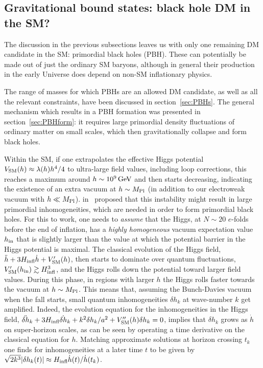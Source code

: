 \subsection{Gravitational bound states: black hole DM in the SM?}\label{sec:PBHSM}
The discussion in the previous subsections leaves us with only one remaining DM candidate in the SM: primordial black holes (PBH). 
These can potentially be made out of just the ordinary SM baryons, although in general their production in the early Universe does depend on non-SM inflationary physics. 


The range of masses for which PBHs are an allowed DM candidate, as well as all the relevant constraints, have been discussed in section~\ref{sec:PBHs}. 
The general mechanism which results in a PBH formation was presented in section~\ref{sec:PBHform}: 
it requires large primordial density fluctuations of ordinary matter on small scales, which then gravitationally collapse and form black holes.

\smallskip



Within the SM, if one extrapolates the effective Higgs potential $V_{\rm SM}(h) \approx \lambda(h) h^4/4$ to ultra-large field values, including loop corrections,
this reaches a maximum around  $h \sim 10^9\,{\rm GeV}$ and then starts decreasing, 
indicating the existence of an extra vacuum at $h \sim M_{\rm Pl}$
(in addition to our electroweak vacuum with $h \ll M_{\rm Pl}$).
 in~\cite{PBHformationTh} proposed that this instability 
might result in large primordial inhomogeneities, which are needed in order to form primordial black holes.
For this to work, one needs to {\em assume} that the Higgs, at $N \sim 20$ $e$-folds before the end of inflation,
has a 
{\em highly homogeneous} vacuum expectation value $h_{\rm in}$ that is slightly larger than the value at which the potential barrier in the Higgs potential is maximal. 
The classical evolution of the Higgs field, $\ddot h + 3 H_{\rm infl} \dot h + V'_{\rm SM}(h)$, 
then starts to dominate over quantum fluctuations, $V'_{\rm SM} (h_{\rm in}) \gtrsim H^3_{\rm infl}$, and the 
Higgs rolls down the potential toward larger field values.
During this phase, in regions with larger $h$ 
the Higgs rolls faster towards the vacuum at $h \sim M_{\rm Pl}$.
This means that, assuming the Bunch-Davies vacuum when the fall starts,
small quantum inhomogeneities $\delta h_k$ at wave-number $k$ get amplified.
Indeed, the evolution equation for the inhomogeneities in the Higgs field, 
$\ddot{\delta h}_k + 3H_{\rm infl} \dot{\delta h}_k +k^2 \delta h_k/a^2 + V_{\rm SM}^{\prime\prime}(h)\delta h_k = 0$, 
implies that $\delta h_k$ grows as $\dot h$  on super-horizon scales,
as can be seen by operating a time derivative on the classical equation for $h$.
Matching approximate solutions at horizon crossing $t_k$ one finds for inhomogeneities at a later time $t$ to be given by $ \sqrt{2k^3}|\delta h_k(t)| \approx H_{\rm infl} \dot h(t)/\dot{h}(t_k)$.

